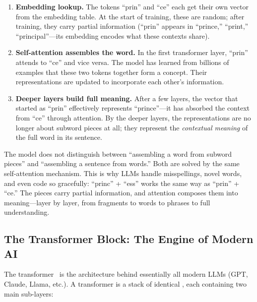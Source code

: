 \begin{enumerate}[leftmargin=2em]
  \item \textbf{Embedding lookup.} The tokens ``prin'' and ``ce''
    each get their own vector from the embedding table. At the start
    of training, these are random; after training, they carry partial
    information (``prin'' appears in ``prince,'' ``print,''
    ``principal''---its embedding encodes what these contexts share).

  \item \textbf{Self-attention assembles the word.} In the first
    transformer layer, ``prin'' attends to ``ce'' and vice versa.
    The model has learned from billions of examples that these two
    tokens together form a concept. Their representations are updated
    to incorporate each other's information.

  \item \textbf{Deeper layers build full meaning.} After a few
    layers, the vector that started as ``prin'' effectively represents
    ``prince''---it has absorbed the context from ``ce'' through
    attention. By the deeper layers, the representations are no longer
    about subword pieces at all; they represent the \emph{contextual
    meaning} of the full word in its sentence.
\end{enumerate}

\begin{keyinsight}
The model does not distinguish between ``assembling a word from
subword pieces'' and ``assembling a sentence from words.'' Both are
solved by the same self-attention mechanism. This is why LLMs handle
misspellings, novel words, and even code so gracefully: ``princ'' +
``ess'' works the same way as ``prin'' + ``ce.'' The pieces carry
partial information, and attention composes them into meaning---layer
by layer, from fragments to words to phrases to full understanding.
\end{keyinsight}

\subsection{The Transformer Block: The Engine of Modern AI}
\label{sec:transformer-block}

The transformer~\cite{vaswani2017attention} is the architecture
behind essentially all modern LLMs (GPT, Claude, Llama, etc.). A
transformer is a stack of identical , each
containing two main sub-layers:

